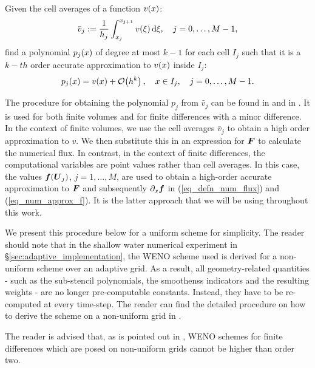 \documentclass[final]{amsart}
\renewcommand{\vec}[1]{\geovec{#1}}
\numberwithin{equation}{section}
\begin{document}
\begin{Defn}
	Given the cell averages of a function $v\!\left({x}\right)$:
	\begin{equation}
	\bar{v}_j:= \frac{1}{h_j}\int_{x_j}^{x_{j+1}} v\!\left({\xi}\right)\mathrm{d}\xi, \quad j=0,\dots,M-1,
	\end{equation}
	find a polynomial $p_j\!\left({x}\right)$ of degree at most $k-1$ for each cell $I_j$ such that it is a $k-th$ order accurate approximation to $v\!\left({x}\right)$ inside $I_j$:
	\begin{equation}
	p_j\!\left({x}\right) = v\!\left({x}\right) + \mathcal{O}\!\left({h^k}\right), \quad x\in I_j, \quad j=0,\dots,M-1.
	\end{equation}
\end{Defn}
The procedure for obtaining the polynomial $p_j$ from $\bar{v}_j$ can
be found in \cite[Procedure 2.2]{shu1998essentially} and in
\cite[\S.2.2]{shu2020essentially}.  It is used  for both
finite volumes and for finite differences with a minor difference.  In
the context of finite volumes, we use the cell averages $\bar{v}_j$ to
obtain a high order approximation to $v$.  We then substitute this in
an expression for $\vec{F}$ to calculate the numerical flux. In
contrast, in the context of finite differences, the computational
variables are point values rather than cell averages. In this case, the values 
$\vec{f}\qp{\vec{U}_j}$, $j=1,\dots,M$, are used  to obtain a high-order accurate approximation to $\vec{F}$
and subsequently $\partial_x\vec{f}$ in (\ref{eq_defn_num_flux}) and
(\ref{eq_num_approx_f}).  It is the latter approach that we will be using
throughout this work.

We present this procedure below for a uniform scheme for simplicity.
The reader should note that in the shallow water numerical experiment in
\S\ref{sec:adaptive_implementation}, the WENO scheme used is derived for
a non-uniform scheme over an adaptive grid.
As a result, all geometry-related quantities - such as the sub-stencil polynomials, the smoothenss indicators and the resulting weights - are no longer pre-computable constants.  Instead, they have to be re-computed at every time-step.
The reader can find the detailed procedure on how to
derive the scheme on a non-uniform grid in \cite{shu1998essentially}.

\begin{Rem}
	The reader is advised that, as is pointed out in
	\cite{shu1998essentially}, WENO schemes for finite differences which
	are posed on non-uniform grids cannot be higher than order
	two.
\end{Rem}
\end{document}
